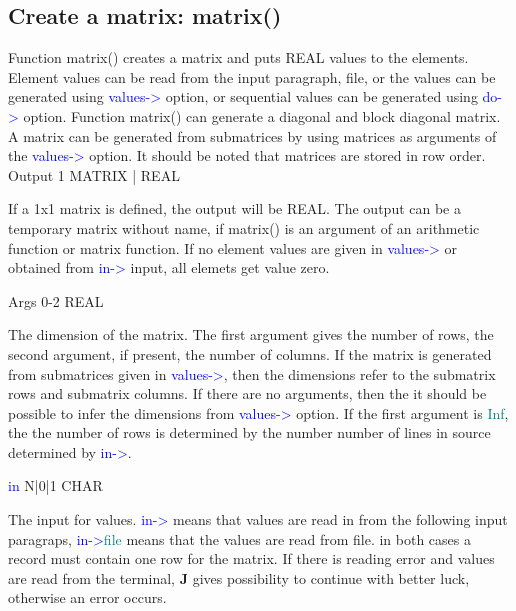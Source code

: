 \subsection{Create a matrix: \textcolor{VioletRed}{matrix}()}
\label{matrix}
Function \textcolor{VioletRed}{matrix}() creates a matrix and puts REAL values to the elements. Element values
can be read from the input paragraph, file, or the values can be generated
using \textcolor{blue}{values->} option, or sequential values can be generated
using \textcolor{blue}{do->} option. Function \textcolor{VioletRed}{matrix}() can generate a diagonal and block diagonal matrix.
A matrix can be generated from submatrices by using matrices as arguments
of the  \textcolor{blue}{values->} option. It should be noted that matrices are stored in row order.
\vspace{0.3cm}
\hline
\vspace{0.3cm}
\noindent Output \tabto{3cm}  1 \tabto{5cm}   MATRIX | REAL \tabto{7cm}
\begin{changemargin}{3cm}{0cm}
\noindent  If a 1x1 matrix is defined, the output will be REAL.
The output can be a temporary matrix without name, if \textcolor{VioletRed}{matrix}() is an argument
of an arithmetic function  or matrix function. If no element values are
given in \textcolor{blue}{values->} or obtained from \textcolor{blue}{in->} input, all elemets get value zero.
\end{changemargin}
\vspace{0.3cm}
\hline
\vspace{0.3cm}
\noindent Args \tabto{3cm} 0-2 \tabto{5cm}  REAL \tabto{7cm}
\begin{changemargin}{3cm}{0cm}
\noindent  The dimension of the matrix. The first argument gives the number of rows,
the second argument, if present, the number of columns.  If the matrix is generated from submatrices given in \textcolor{blue}{values->}, then the dimensions
refer to the submatrix rows and submatrix columns. If there are no arguments, then the
it should be possible to infer the dimensions from \textcolor{blue}{values->} option. If the
first argument is \textcolor{teal}{Inf}, the the number of rows is determined by the number
number of lines in source determined by \textcolor{blue}{in->}.
\end{changemargin}
\vspace{0.3cm}
\hline
\vspace{0.3cm}
\noindent \textcolor{blue}{in} \tabto{3cm} N|0|1 \tabto{5cm}  CHAR \tabto{7cm}
\begin{changemargin}{3cm}{0cm}
\noindent  The input for values. \textcolor{blue}{in->} means that values are read in from
the following input paragraps, \textcolor{blue}{in->}\textcolor{teal}{file} means that the values are read from file.
in both cases a record must contain one row for the matrix.
If there is reading error and values are read from the terminal, \textbf{J} gives
possibility to continue with better luck, otherwise an error occurs.
\end{changemargin}
